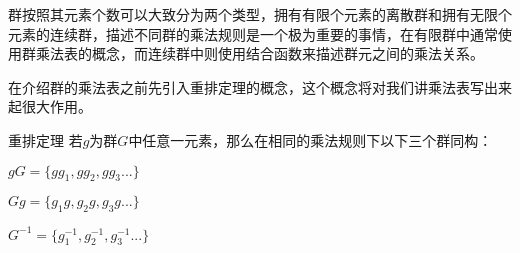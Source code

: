 

群按照其元素个数可以大致分为两个类型，拥有有限个元素的离散群和拥有无限个元素的连续群，描述不同群的乘法规则是一个极为重要的事情，在有限群中通常使用群乘法表的概念，而连续群中则使用结合函数来描述群元之间的乘法关系。

在介绍群的乘法表之前先引入重排定理的概念，这个概念将对我们讲乘法表写出来起很大作用。

\begin{theorem}{重排定理}
若$g$为群$G$中任意一元素，那么在相同的乘法规则下以下三个群同构：

$gG=\{gg_1,gg_2,gg_3...\}$

$Gg=\{g_1g,g_2g,g_3g...\}$

$G^{-1}=\{g_1^{-1},g_2^{-1},g_3^{-1}...\}$
\end{theorem}